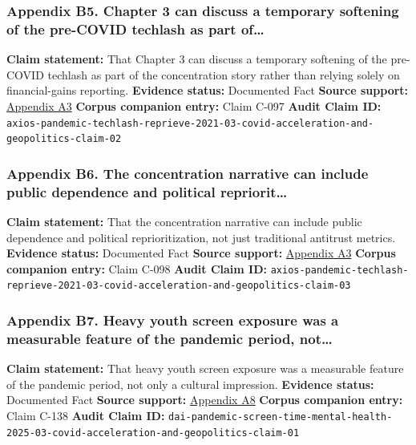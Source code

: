 \documentclass[
  american,
  11pt,
  letterpaper,
]{article}
\begin{document}
\subsubsection{Appendix B5. Chapter 3 can discuss a temporary softening
of the pre-COVID techlash as part
of\ldots{}}\label{ch-03-appendix-b5-chapter-3-can-discuss-a-temporary-softening-of-the-pre-covid-techlash-as-part-of}

\textbf{Claim statement:} That Chapter 3 can discuss a temporary
softening of the pre-COVID techlash as part of the concentration story
rather than relying solely on financial-gains reporting.
\textbf{Evidence status:} Documented Fact \textbf{Source support:}
\hyperref[ch-03-appendix-a3-pandemic-provides-a-techlash-reprieve]{Appendix
A3} \textbf{Corpus companion entry:} Claim C-097 \textbf{Audit Claim
ID:}
\texttt{axios-pandemic-techlash-reprieve-2021-03-covid-acceleration-and-geopolitics-claim-02}

\subsubsection{Appendix B6. The concentration narrative can include
public dependence and political
repriorit\ldots{}}\label{ch-03-appendix-b6-the-concentration-narrative-can-include-public-dependence-and-political-repriorit}

\textbf{Claim statement:} That the concentration narrative can include
public dependence and political reprioritization, not just traditional
antitrust metrics. \textbf{Evidence status:} Documented Fact
\textbf{Source support:}
\hyperref[ch-03-appendix-a3-pandemic-provides-a-techlash-reprieve]{Appendix
A3} \textbf{Corpus companion entry:} Claim C-098 \textbf{Audit Claim
ID:}
\texttt{axios-pandemic-techlash-reprieve-2021-03-covid-acceleration-and-geopolitics-claim-03}

\subsubsection{Appendix B7. Heavy youth screen exposure was a measurable
feature of the pandemic period,
not\ldots{}}\label{ch-03-appendix-b7-heavy-youth-screen-exposure-was-a-measurable-feature-of-the-pandemic-period-not}

\textbf{Claim statement:} That heavy youth screen exposure was a
measurable feature of the pandemic period, not only a cultural
impression. \textbf{Evidence status:} Documented Fact \textbf{Source
support:}
\hyperref[ch-03-appendix-a8-excessive-screen-time-is-associated-with-mental-health-problems-and-adhd-in-us-children-and-adolescents-physical-activity-and-sleep-as-parallel-mediators]{Appendix
A8} \textbf{Corpus companion entry:} Claim C-138 \textbf{Audit Claim
ID:}
\texttt{dai-pandemic-screen-time-mental-health-2025-03-covid-acceleration-and-geopolitics-claim-01}
\end{document}
